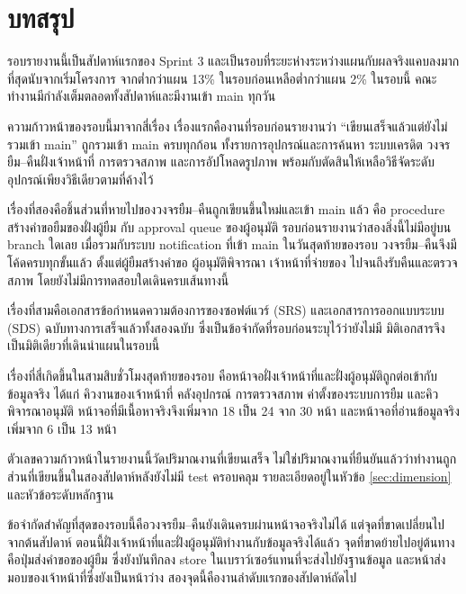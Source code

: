 \section{บทสรุป}

รอบรายงานนี้เป็นสัปดาห์แรกของ Sprint 3 และเป็นรอบที่ระยะห่างระหว่างแผนกับผลจริงแคบลงมากที่สุดนับจากเริ่มโครงการ จากต่ำกว่าแผน 13\% ในรอบก่อนเหลือต่ำกว่าแผน 2\% ในรอบนี้ คณะทำงานมีกำลังเต็มตลอดทั้งสัปดาห์และมีงานเข้า main ทุกวัน

ความก้าวหน้าของรอบนี้มาจากสี่เรื่อง เรื่องแรกคืองานที่รอบก่อนรายงานว่า ``เขียนเสร็จแล้วแต่ยังไม่รวมเข้า main'' ถูกรวมเข้า main ครบทุกก้อน ทั้งรายการอุปกรณ์และการค้นหา ระบบเครดิต วงจรยืม–คืนฝั่งเจ้าหน้าที่ การตรวจสภาพ และการอัปโหลดรูปภาพ พร้อมกับตัดสินให้เหลือวิธีจัดระดับอุปกรณ์เพียงวิธีเดียวตามที่ค้างไว้

เรื่องที่สองคือชิ้นส่วนที่หายไปของวงจรยืม–คืนถูกเขียนขึ้นใหม่และเข้า main แล้ว คือ procedure สร้างคำขอยืมของฝั่งผู้ยืม กับ approval queue ของผู้อนุมัติ รอบก่อนรายงานว่าสองสิ่งนี้ไม่มีอยู่บน branch ใดเลย เมื่อรวมกับระบบ notification ที่เข้า main ในวันสุดท้ายของรอบ วงจรยืม–คืนจึงมีโค้ดครบทุกขั้นแล้ว ตั้งแต่ผู้ยืมสร้างคำขอ ผู้อนุมัติพิจารณา เจ้าหน้าที่จ่ายของ ไปจนถึงรับคืนและตรวจสภาพ โดยยังไม่มีการทดสอบใดเดินครบเส้นทางนี้

เรื่องที่สามคือเอกสารข้อกำหนดความต้องการของซอฟต์แวร์ (SRS) และเอกสารการออกแบบระบบ (SDS) ฉบับทางการเสร็จแล้วทั้งสองฉบับ ซึ่งเป็นข้อจำกัดที่รอบก่อนระบุไว้ว่ายังไม่มี มิติเอกสารจึงเป็นมิติเดียวที่เดินนำแผนในรอบนี้

เรื่องที่สี่เกิดขึ้นในสามสิบชั่วโมงสุดท้ายของรอบ คือหน้าจอฝั่งเจ้าหน้าที่และฝั่งผู้อนุมัติถูกต่อเข้ากับข้อมูลจริง ได้แก่ คิวงานของเจ้าหน้าที่ คลังอุปกรณ์ การตรวจสภาพ ค่าตั้งของระบบการยืม และคิวพิจารณาอนุมัติ หน้าจอที่มีเนื้อหาจริงจึงเพิ่มจาก 18 เป็น 24 จาก 30 หน้า และหน้าจอที่อ่านข้อมูลจริงเพิ่มจาก 6 เป็น 13 หน้า

ตัวเลขความก้าวหน้าในรายงานนี้วัดปริมาณงานที่เขียนเสร็จ ไม่ใช่ปริมาณงานที่ยืนยันแล้วว่าทำงานถูก ส่วนที่เขียนขึ้นในสองสัปดาห์หลังยังไม่มี test ครอบคลุม รายละเอียดอยู่ในหัวข้อ \ref{sec:dimension} และหัวข้อระดับหลักฐาน

ข้อจำกัดสำคัญที่สุดของรอบนี้คือวงจรยืม–คืนยังเดินครบผ่านหน้าจอจริงไม่ได้ แต่จุดที่ขาดเปลี่ยนไปจากต้นสัปดาห์ ตอนนี้ฝั่งเจ้าหน้าที่และฝั่งผู้อนุมัติทำงานกับข้อมูลจริงได้แล้ว จุดที่ขาดย้ายไปอยู่ต้นทางคือปุ่มส่งคำขอของผู้ยืม ซึ่งยังบันทึกลง store ในเบราว์เซอร์แทนที่จะส่งไปยังฐานข้อมูล และหน้าส่งมอบของเจ้าหน้าที่ซึ่งยังเป็นหน้าว่าง สองจุดนี้คืองานลำดับแรกของสัปดาห์ถัดไป

